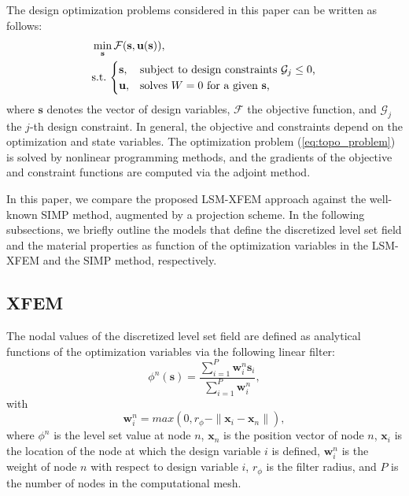 The design optimization problems considered in this paper can be written as follows:
%
\begin{equation}
\label{eq:topo_problem}
	\begin{aligned}
		&\min_{\mathbf{s}} \mathcal{F}(\mathbf{s}, \mathbf{u}(\mathbf{s})), \\
		&\text{s.t.\,}
		\begin{cases}
			\mathbf{s}, & \text{subject to design constraints}  \ \mathcal{G}_j \leq 0 \text{,}\\
			\mathbf{u}, & \text{solves} \ W= 0 \ \text{for a given $\mathbf{s}$,}
		\end{cases}
	\end{aligned}
\end{equation}
%
where $\mathbf{s}$ denotes the vector of design variables, $\mathcal{F}$ the objective function, and $\mathcal{G}_j$ the $j$-th design constraint. In general, the objective and constraints depend on the optimization and state variables. The optimization problem (\ref{eq:topo_problem}) is solved by nonlinear programming methods, and the gradients of the objective and constraint functions are computed via the adjoint method.

In this paper, we compare the proposed LSM-XFEM approach against the well-known SIMP method, augmented by a projection scheme. In the following subsections, we briefly outline the models that define the discretized level set field and the material properties as function of the optimization variables in the LSM-XFEM and the SIMP method, respectively.


\subsection{XFEM}
\label{sec:optimization-XFEM}

The nodal values of the discretized level set field are defined as analytical functions of the optimization variables via the following linear filter:
%
\begin{equation}
\label{eq:level-set-filter}
	\phi^{n}(\mathbf{s}) = \frac{ \sum \limits^{P}_{i=1} \mathbf{w}^{n}_{i} \mathbf{s}_i } { \sum \limits^{P}_{i=1} \mathbf{w}^{n}_{i} },
\end{equation}
%
with
%
\begin{equation}
\label{eq:level-set-filter-weight}
	\mathbf{w}^{n}_{i} = max \left( { 0,  r_{\phi} - \parallel \mathbf{x}_i - \mathbf{x}_n \parallel }\right),
\end{equation}
%
where $\phi^{n}$ is the level set value at node $n$, $\mathbf{x}_n$ is the position vector of node $n$, $\mathbf{x}_{i}$ is the location of the node at which the design variable $i$ is defined, $\mathbf{w}^{n}_{i}$ is the weight of node $n$ with respect to design variable $i$, $r_{\phi}$ is the filter radius, and $P$ is the number of nodes in the computational mesh. 

